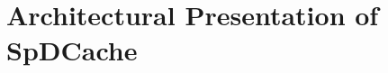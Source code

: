 
\chapter[SpDCache]{Architectural Presentation of SpDCache}
\label{cha:spdc}

\minitoc










\clearpage